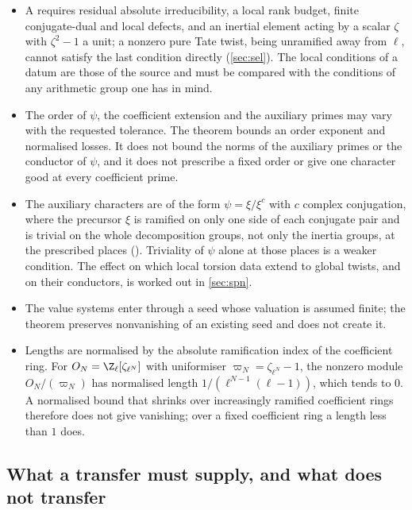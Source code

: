 \begin{itemize}
\item A  requires residual absolute irreducibility, a local rank budget,
finite conjugate-dual and local defects, and an inertial element acting by a scalar $\zeta$
with $\zeta^2-1$ a unit; a nonzero pure Tate twist, being unramified away from $\ell$, cannot
satisfy the last condition directly (\cref{sec:sel}). The local conditions of a datum are
those of the source and must be compared with the conditions of any arithmetic group one has
in mind.
\item The order of $\psi$, the coefficient extension and the auxiliary primes may vary with
the requested tolerance. The theorem bounds an order exponent and normalised losses. It does
not bound the norms of the auxiliary primes or the conductor of $\psi$, and it does not
prescribe a fixed order or give one character good at every coefficient prime.
\item The auxiliary characters are of the form $\psi=\xi/\xi^c$ with $c$ complex conjugation,
where the precursor $\xi$ is ramified on only one side of each conjugate pair and is trivial
on the whole decomposition groups, not only the inertia groups, at the prescribed places
(). Triviality of $\psi$ alone at those places is a weaker condition. The
effect on which local torsion data extend to global twists, and on their conductors, is worked
out in \cref{sec:spn}.
\item The value systems enter through a seed whose valuation is assumed finite; the theorem
preserves nonvanishing of an existing seed and does not create it.
\item Lengths are normalised by the absolute ramification index of the coefficient ring. For
$O_N=\Z_\ell[\zeta_{\ell^N}]$ with uniformiser $\varpi_N=\zeta_{\ell^N}-1$, the nonzero module
$O_N/(\varpi_N)$ has normalised length $1/(\ell^{N-1}(\ell-1))$, which tends to $0$. A
normalised bound that shrinks over increasingly ramified coefficient rings therefore does
not give vanishing; over a fixed coefficient ring a length less than $1$ does.
\end{itemize}

\subsection{What a transfer must supply, and what does not transfer}\label{src:sec:limits}
\begingroup\raggedright
{}
\endgroup

